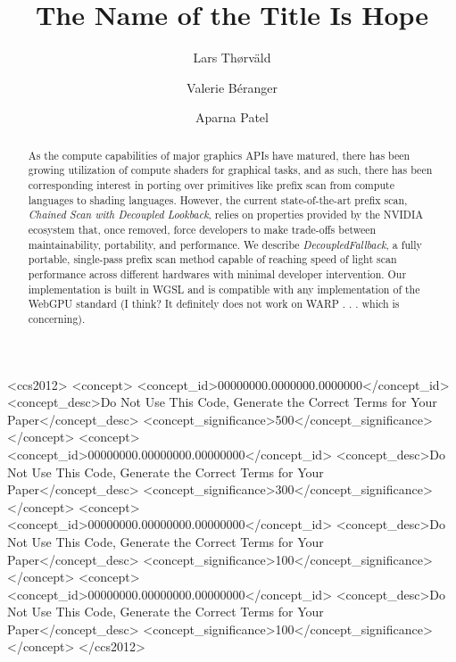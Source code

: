 \documentclass[sigconf]{acmart}
\begin{document}
\title{The Name of the Title Is Hope}

\author{Lars Th{\o}rv{\"a}ld}

\author{Valerie B\'eranger}

\author{Aparna Patel}

\renewcommand{\shortauthors}{Trovato et al.}

\begin{abstract}
As the compute capabilities of major graphics APIs have matured, there has been growing utilization of compute shaders for graphical tasks, and as such, there has been corresponding interest in porting over primitives like prefix scan from compute languages to shading languages. However, the current state-of-the-art prefix scan, \textit{Chained Scan with Decoupled Lookback}, relies on properties provided by the NVIDIA ecosystem that, once removed, force developers to make trade-offs between maintainability, portability, and performance. We describe \textit{DecoupledFallback}, a fully portable, single-pass prefix scan method capable of reaching speed of light scan performance across different hardwares with minimal developer intervention. Our implementation is built in WGSL and is compatible with any implementation of the WebGPU standard (I think? It definitely does not work on WARP . . . which is concerning).
\end{abstract}

\begin{CCSXML}
<ccs2012>
 <concept>
  <concept_id>00000000.0000000.0000000</concept_id>
  <concept_desc>Do Not Use This Code, Generate the Correct Terms for Your Paper</concept_desc>
  <concept_significance>500</concept_significance>
 </concept>
 <concept>
  <concept_id>00000000.00000000.00000000</concept_id>
  <concept_desc>Do Not Use This Code, Generate the Correct Terms for Your Paper</concept_desc>
  <concept_significance>300</concept_significance>
 </concept>
 <concept>
  <concept_id>00000000.00000000.00000000</concept_id>
  <concept_desc>Do Not Use This Code, Generate the Correct Terms for Your Paper</concept_desc>
  <concept_significance>100</concept_significance>
 </concept>
 <concept>
  <concept_id>00000000.00000000.00000000</concept_id>
  <concept_desc>Do Not Use This Code, Generate the Correct Terms for Your Paper</concept_desc>
  <concept_significance>100</concept_significance>
 </concept>
</ccs2012>
\end{CCSXML}
\end{document}
